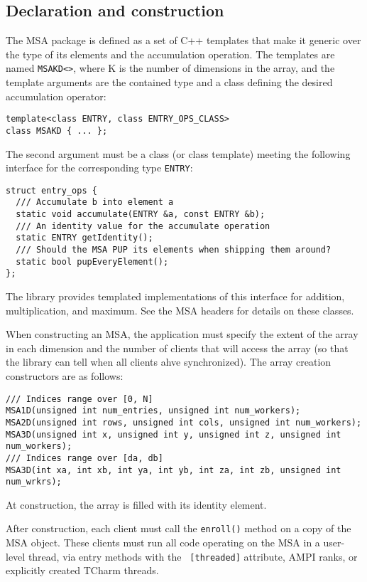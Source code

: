 \subsection{Declaration and construction}

The MSA package is defined as a set of C++ templates that make it
generic over the type of its elements and the accumulation operation.
The templates are named {\tt MSAKD<>}, where K is the number of
dimensions in the array, and the template arguments are the contained
type and a class defining the desired accumulation operator:

\begin{verbatim}
template<class ENTRY, class ENTRY_OPS_CLASS>
class MSAKD { ... };
\end{verbatim}

The second argument must be a class (or class template) meeting the
following interface for the corresponding type {\tt ENTRY}:
\begin{verbatim}
struct entry_ops {
  /// Accumulate b into element a
  static void accumulate(ENTRY &a, const ENTRY &b);
  /// An identity value for the accumulate operation
  static ENTRY getIdentity();
  /// Should the MSA PUP its elements when shipping them around?
  static bool pupEveryElement();
};
\end{verbatim}
The library provides templated implementations of this interface for
addition, multiplication, and maximum. See the MSA headers for details
on these classes.

When constructing an MSA, the application must specify the extent of
the array in each dimension and the number of clients that will access
the array (so that the library can tell when all clients ahve
synchronized). The array creation constructors are as follows:
\begin{verbatim}
/// Indices range over [0, N]
MSA1D(unsigned int num_entries, unsigned int num_workers);
MSA2D(unsigned int rows, unsigned int cols, unsigned int num_workers);
MSA3D(unsigned int x, unsigned int y, unsigned int z, unsigned int num_workers);
/// Indices range over [da, db]
MSA3D(int xa, int xb, int ya, int yb, int za, int zb, unsigned int num_wrkrs);
\end{verbatim}
At construction, the array is filled with its identity element.

After construction, each client must call the {\tt enroll()} method on
a copy of the MSA object. These clients must run all code operating on
the MSA in a user-level thread, via entry methods with the {\tt
  [threaded]} attribute, AMPI ranks, or explicitly created {\sc
  TCharm} threads.

